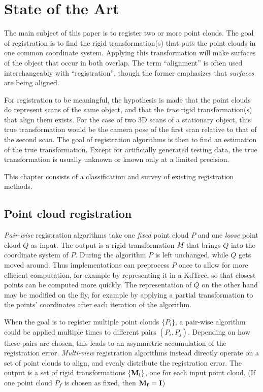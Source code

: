 \chapter{State of the Art} \label{ch:pcreg}
The main subject of this paper is to register two or more point clouds. The goal of registration is to find the rigid transformation(s) that puts the point clouds in one common coordinate system. Applying this transformation will make surfaces of the object that occur in both overlap. The term ``alignment'' is often used interchangeably with ``registration'', though the former emphasizes that \emph{surfaces} are being aligned.

For registration to be meaningful, the hypothesis is made that the point clouds do represent scans of the same object, and that the \emph{true} rigid transformation(s) that align them exists. For the case of two 3D scans of a stationary object, this true transformation would be the camera pose of the first scan relative to that of the second scan. The goal of registration algorithms is then to find an estimation of the true transformation. Except for artificially generated testing data, the true transformation is usually unknown or known only at a limited precision.

This chapter consists of a classification and survey of existing registration methods.

\section{Point cloud registration}

\emph{Pair-wise} registration algorithms take one \emph{fixed} point cloud $P$ and one \emph{loose} point cloud $Q$ as input. The output is a rigid transformation $\emph{M}$ that brings $Q$ into the coordinate system of $P$. During the algorithm $P$ is left unchanged, while $Q$ gets moved around. Thus implementations can preprocess $P$ once to allow for more efficient computation, for example by representing it in a KdTree, so that closest points can be computed more quickly. The representation of $Q$ on the other hand may be modified on the fly, for example by applying a partial transformation to the points' coordinates after each iteration of the algorithm.

When the goal is to register multiple point clouds $\{ P_i \}$, a pair-wise algorithm could be applied multiple times to different pairs $(P_i, P_j)$. Depending on how these pairs are chosen, this leads to an asymmetric accumulation of the registration error. \emph{Multi-view} registration algorithms instead directly operate on a set of point clouds to align, and evenly distribute the registration error. The output is a set of rigid transformations $\{ \mathbf{M_i} \}$, one for each input point cloud. (If one point cloud $P_f$ is chosen as fixed, then $\mathbf{M_f} = \mathbf{I}$)

